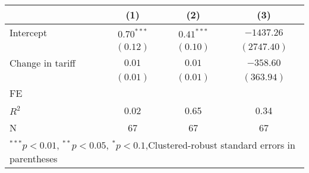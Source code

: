 
\begin{tabular}{l c c c }
\hline
 & (1) & (2) & (3) \\
\hline
Intercept & $0.70^{***}$ & $0.41^{***}$ & $-1437.26$  \\
            & $(0.12)$     & $(0.10)$     & $(2747.40)$ \\
Change in tariff     & $0.01$       & $0.01$       & $-358.60$   \\
            & $(0.01)$     & $(0.01)$     & $(363.94)$  \\
\hline
FE          &                &                &                \\ 
\hline
$R^2$       & 0.02         & 0.65         & 0.34        \\
N           & 67           & 67           & 67          \\
\hline
\multicolumn{4}{l}{\scriptsize{$^{***}p<0.01$, $^{**}p<0.05$, $^*p<0.1$,Clustered-robust standard errors in parentheses}}
\end{tabular}

